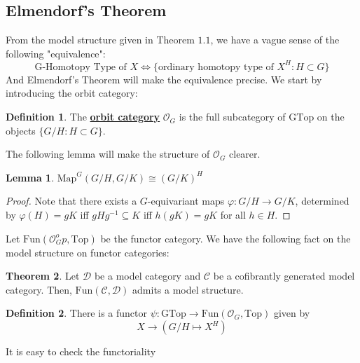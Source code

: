 \documentclass{article}
\theoremstyle{definition}
\newtheorem{theorem}{Theorem}[section]
\theoremstyle{definition}
\newtheorem{definition}{Definition}[theorem]
\theoremstyle{definition}
\theoremstyle{definition}
\theoremstyle{definition}
\newtheorem{lemma}[theorem]{Lemma}
\theoremstyle{definition}
\theoremstyle{definition}
\begin{document}
\subsection{Elmendorf's Theorem}
From the model structure given in Theorem $1.1$, we have a vague sense of the following "equivalence":
\[\textrm{G-Homotopy Type of } X\Leftrightarrow \{ \textrm{ordinary homotopy type of } X^H:H\subset G \}\]
And Elmendorf's Theorem will make the equivalence precise. We start by introducing the orbit category:

\begin{tcolorbox}[colback=purple!5!white,colframe=purple!75!black]
\begin{definition}
The \underline{\textbf{orbit category}} $\mathcal{O}_G$ is the full subcategory of $\textrm{GTop}$ on the objects $\{G/H: H\subset G\}$.
\end{definition}
\end{tcolorbox}
The following lemma will make the structure of $\mathcal{O}_G$ clearer.

\begin{tcolorbox}
\begin{lemma}
$\textrm{Map}^G(G/H,G/K)\cong (G/K)^H$
\end{lemma}
\end{tcolorbox}
\begin{proof}
    Note that there exists a $G$-equivariant maps $\varphi: G/H\to G/K$, determined by $\varphi(H)=gK$ iff $gHg^{-1}\subseteq K$ iff $h(gK)=gK$ for all $h\in H$. 
\end{proof}

Let $\textrm{Fun}(\mathcal{O}_G^op,\textrm{Top})$ be the functor category. We have the following fact on the model structure on functor categories:

\begin{tcolorbox}[colback=red!5!white,colframe=red!30!white]
\begin{theorem}
Let $\mathcal{D}$ be a model category and $\mathcal{C}$ be a cofibrantly generated model category. Then, $\textrm{Fun}(\mathcal{C},\mathcal{D})$ admits a model structure. 
\end{theorem}
\end{tcolorbox}




\begin{tcolorbox}[colback=purple!5!white,colframe=purple!75!black]
\begin{definition}
There is a functor $\psi: \textrm{GTop}\to \textrm{Fun}(\mathcal{O}_G,\textrm{Top})$ given by 
\[X\to (G/H\mapsto X^H)\]
\end{definition}
\end{tcolorbox}
It is easy to check the functoriality 
\end{document}
